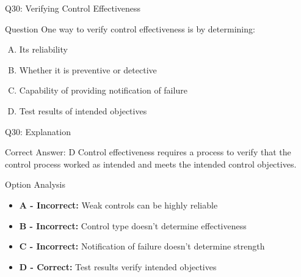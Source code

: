 \documentclass{beamer}
\begin{document}
	\begin{frame}{Q30: Verifying Control Effectiveness}
		\begin{block}{Question}
			One way to verify control effectiveness is by determining:
		\end{block}
		\begin{enumerate}[(A)]
			\item Its reliability
			\item Whether it is preventive or detective
			\item Capability of providing notification of failure
			\item Test results of intended objectives
		\end{enumerate}
	\end{frame}
	
	\begin{frame}{Q30: Explanation}
		\begin{block}{Correct Answer: D}
			Control effectiveness requires a process to verify that the control process worked as intended and meets the intended control objectives.
		\end{block}
		\begin{block}{Option Analysis}
			\begin{itemize}
				\item \textbf{A - Incorrect:} Weak controls can be highly reliable
				\item \textbf{B - Incorrect:} Control type doesn't determine effectiveness
				\item \textbf{C - Incorrect:} Notification of failure doesn't determine strength
				\item \textbf{D - Correct:} Test results verify intended objectives
			\end{itemize}
		\end{block}
	\end{frame}
	
\end{document}
